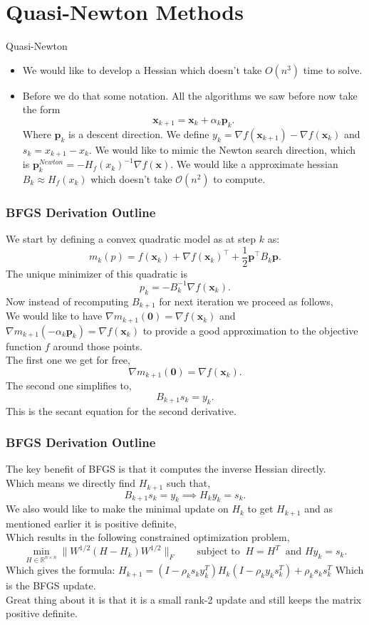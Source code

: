 \documentclass{beamer}
\begin{document}
\section{Quasi-Newton Methods}
\begin{frame}{Quasi-Newton}
	\begin{itemize}
		\item We would like to develop a Hessian which doesn't take $O(n^3)$ time to solve.
		\item Before we do that some notation. All the algorithms we saw before now take the form
		      \[
			      \bm x_{k+1} = \bm x_k + \alpha_k \bm p_k
			      .\]
		      Where $\bm p_k$ is a descent direction.
		      We define $y_k = \nabla f(\bm x_{k+1}) - \nabla f(\bm x_{k})$ and $s_{k} = x_{k+1}- x_{k}$.
		      We would like to mimic the Newton search direction, which is
		      $\bm p_k^{Newton} = -H_f(x_k)^{-1}\nabla f(\bm x)$.
		      We would like a approximate hessian $ B_k \approx H_f(x_k)$ which doesn't take $\mathcal{O}(n^2)$ to compute.
	\end{itemize}
\end{frame}
\begin{frame}[t]
	\frametitle{BFGS Derivation Outline}
	We start by defining a convex quadratic model as at step $k$ as:
	\[
		m_{k}(p) = f(\bm x_k) + \nabla f(\bm x_{k})^\top + \frac{1}{2} \bm p^\top B_k \bm p
		.\]
	The unique minimizer of this quadratic is
	\[
		p_{k} = -B_k^{-1} \nabla f(\bm x_k)
		.\]
	Now instead of recomputing $B_{k+1}$ for next iteration we proceed as follows,\\
	We would like to have $\nabla m_{k+1}(\bm 0) = \nabla f(\bm x_k)$ and $\nabla m_{k+1}(\bm -\alpha_k \bm p_k) = \nabla f(\bm x_k)$ to provide a good approximation to the objective function $f$ around those points.\\
	The first one we get for free,
	\[
		\nabla m_{k+1}(\bm 0) = \nabla f(\bm x_k)
		.\]
	The second one simplifies to,
	\[
		B_{k+1} s_k=y_k
		.\]
	This is the secant equation for the second derivative.
\end{frame}
\begin{frame}[t]
	\frametitle{BFGS Derivation Outline}
	The key benefit of BFGS is that it computes the inverse Hessian directly.\\
	Which means we directly find $H_{k+1}$ such that,
	\[
		B_{k+1}s_k = y_k \implies H_{k}y_k = s_k
		.\]
	We also would like to make the minimal update on $H_k$ to get $H_{k+1}$ and as mentioned earlier it is positive definite, \\
	Which results in the following constrained optimization problem,
	\[
		\min_{H\in \mathbb{R}^{n\times n}} \|W^{1/2}(H-H_k)W^{1/2}\|_F \qquad \text{subject to } \: H=H^T \ \text{ and } Hy_k = s_k
		.\]
	Which gives the formula:
	$H_{k+1}=\left(I-\rho_k s_k y_k^T\right) H_k\left(I-\rho_k y_k s_k^T\right)+\rho_k s_k s_k^T$
	Which is the BFGS update.\\
	Great thing about it is that it is a small rank-2 update and still keeps the matrix positive definite.
\end{frame}
\end{document}
